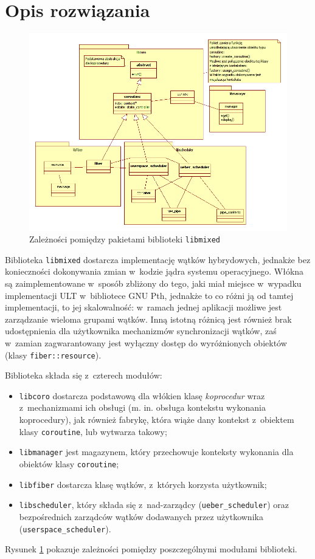 \documentclass[11pt,makeidx]{mwart}
\newcommand{\code}{\texttt}
\newcommand{\dcolon}{::}
\begin{document}
\section{Opis rozwiązania}
\label{sec:solution}
\begin{figure}[h!]
\label{fig:libmixedoverview}
	\centering
	\hspace*{-1cm}\includegraphics[scale=.6, angle=90]{libmixedOverview.png}
	\caption{Zależności pomiędzy pakietami biblioteki \code{libmixed}}
\end{figure}
\indent
	Biblioteka \code{libmixed} dostarcza implementację wątków hybrydowych, jednakże bez konieczności dokonywania zmian w~kodzie jądra systemu operacyjnego.
	Włókna są zaimplementowane w~sposób zbliżony do tego, jaki miał miejsce w~wypadku implementacji ULT w~bibliotece GNU Pth, jednakże to
	co różni ją od tamtej implementacji, to jej skalowalność: w~ramach jednej aplikacji możliwe jest zarządzanie wieloma grupami wątków.
	Inną istotną różnicą jest również brak udostępnienia dla użytkownika mechanizmów synchronizacji wątków, zaś w~zamian zagwarantowany
	jest wyłączny dostęp do wyróżnionych obiektów (klasy \code{fiber\dcolon resource}).
\par
%
\indent
	Biblioteka składa się z~czterech modułów:
	\begin{itemize}
		\item \code{libcoro} dostarcza podstawową dla włókien klasę \emph{koprocedur} wraz z~mechanizmami ich obsługi (m. in. obsługa  kontekstu
			wykonania koprocedury), jak również fabrykę, która wiąże dany kontekst z~obiektem klasy \code{coroutine}, lub wytwarza takowy;
		\item \code{libmanager} jest magazynem, który przechowuje konteksty wykonania dla obiektów klasy \code{coroutine};
		\item \code{libfiber} dostarcza klasę wątków, z~których korzysta użytkownik;
		\item \code{libscheduler}, który składa się z~nad-zarządcy (\code{ueber\_scheduler}) oraz bezpośrednich zarządców wątków dodawanych 
			przez użytkownika \linebreak (\code{userspace\_scheduler}).
	\end{itemize}
	Rysunek \ref{fig:libmixedoverview} pokazuje zależności pomiędzy poszczególnymi modułami biblioteki.
\par
%
\end{document}
